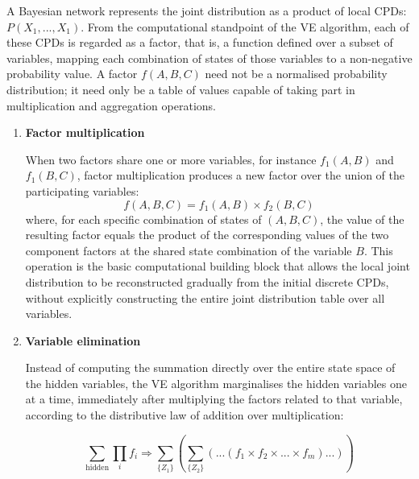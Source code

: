 A Bayesian network represents the joint distribution as a product of local CPDs: $P(X_1,...,X_1)$. From the computational standpoint of the VE algorithm, each of these CPDs is regarded as a factor, that is, a function defined over a subset of variables, mapping each combination of states of those variables to a non-negative probability value. A factor $f(A, B, C)$ need not be a normalised probability distribution; it need only be a table of values capable of taking part in multiplication and aggregation operations.

\begin{enumerate}
    \vspace{1em}
    \item \textbf{Factor multiplication}

    When two factors share one or more variables, for instance $f_1(A, B)$ and $f_1(B, C)$, factor multiplication produces a new factor over the union of the participating variables:
    \begin{equation}
        f(A, B, C) = f_1(A, B) \times f_2(B, C)
    \end{equation}
    where, for each specific combination of states of $(A, B, C)$, the value of the resulting factor equals the product of the corresponding values of the two component factors at the shared state combination of the variable $B$. This operation is the basic computational building block that allows the local joint distribution to be reconstructed gradually from the initial discrete CPDs, without explicitly constructing the entire joint distribution table over all variables.


    \vspace{1em}
    \item \textbf{Variable elimination}

    Instead of computing the summation directly over the entire state space of the hidden variables, the VE algorithm marginalises the hidden variables one at a time, immediately after multiplying the factors related to that variable, according to the distributive law of addition over multiplication:
    
    \begin{equation}
        \sum_{\text{hidden}} \prod_i f_i \Rightarrow \sum_{\{Z_1\}} \left(\sum_{\{Z_2\}} \left( ... \left( f_1 \times f_2 \times ... \times f_m \right) ... \right)\right)
    \end{equation}
    

\end{enumerate}
